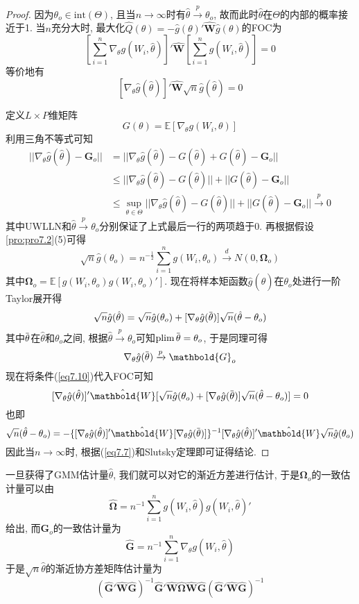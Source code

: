 \documentclass[cn, 12pt, math=mtpro2, bibstyle=apa, blue, twocol]{elegantbook}
\newcommand{\E}{\mathbb{E}}
\newcommand{\W}{\mathbold{W}}
\newcommand{\BO}{\mathbold{\Omega}}
\newcommand{\overbar}[1]{\mkern 1.5mu\overline{\mkern-1.5mu#1\mkern-1.5mu}\mkern 1.5mu}
\begin{document}
\begin{proof}
  因为$\theta_o\in\text{int}(\Theta)$, 且当$n\to\infty$时有$\hat{\theta}\xrightarrow{p}\theta_o$, 故而此时$\hat{\theta}$在$\Theta$的内部的概率接近于1. 当$n$充分大时, 最大化$\hat{Q}(\theta)=-\hat{g}(\theta)'\hat{\W}\hat{g}(\theta)$的FOC为
  $$\left[\sum_{i=1}^{n}\nabla_\theta g(W_i,\hat{\theta})\right]'\hat{\W}\left[\sum_{i=1}^{n} g(W_i,\hat{\theta})\right]=0$$
  等价地有
  $$[\nabla_\theta \hat{g}(\hat{\theta})]'\hat{\W}\sqrt{n}\hat{g}(\hat{\theta})=0$$

  定义$L\times P$维矩阵
  $$G(\theta)=\E[\nabla_\theta g(W_i,\theta)]$$
  利用三角不等式可知
  \begin{align*}
  ||\nabla_\theta \hat{g}(\hat{\theta})-\mathbold{G}_o||&=||\nabla_\theta\hat{g}(\hat{\theta})-G(\hat{\theta})+G(\hat{\theta})-\mathbold{G}_o|| \\
  &\leq ||\nabla_\theta \hat{g}(\hat{\theta})-G(\hat{\theta})||+||G(\hat{\theta})-\mathbold{G}_o|| \\
  &\leq \sup_{\theta\in\Theta}||\nabla_\theta \hat{g}(\hat{\theta})-G(\hat{\theta})||+||G(\hat{\theta})-\mathbold{G}_o|| \xrightarrow{p}0
  \end{align*}
  其中UWLLN和$\hat{\theta}\xrightarrow{p}\theta_o$分别保证了上式最后一行的两项趋于0. 再根据假设\ref{pro:pro7.2}(5)可得
  \begin{equation}\label{eq7.7}
    \sqrt{n}\hat{g}(\theta_o)=n^{-\frac{1}{2}}\sum_{i=1}^{n}g(W_i,\theta_o)\xrightarrow{d} N(0,\BO_o)
  \end{equation}
  其中$\BO_o=\E[g(W_i,\theta_o)g(W_i,\theta_o)']$. 现在将样本矩函数$\hat{g}(\hat{\theta})$在$\theta_o$处进行一阶Taylor展开得
  \begin{equation}\label{eq7.10}
    \sqrt{n}\hat{g}(\hat{\theta})=\sqrt{n}\hat{g}(\theta_o)+[\nabla_\theta\hat{g}(\overbar{\theta})]\sqrt{n}(\hat{\theta}-\theta_o)
  \end{equation}
  其中$\overbar{\theta}$在$\hat{\theta}$和$\theta_o$之间, 根据$\hat{\theta}\xrightarrow{p}\theta_o$可知$\text{plim}\,\overbar{\theta}=\theta_o$, 于是同理可得
  $$\nabla_\theta \hat{g}(\overbar{\theta})\xrightarrow{p} \mathbold{G}_o$$
  现在将条件(\ref{eq7.10})代入FOC可知
  $$[\nabla_\theta \hat{g}(\hat{\theta})]'\hat{\W}[\sqrt{n}\hat{g}(\theta_o)+[\nabla_\theta\hat{g}(\overbar{\theta})]\sqrt{n}(\hat{\theta}-\theta_o)]=0$$
  也即
  $$\sqrt{n}(\hat{\theta}-\theta_o)=-\{[\nabla_\theta \hat{g}(\hat{\theta})]'\hat{\W}[\nabla_\theta\hat{g}(\overbar{\theta})]\}^{-1}[\nabla_\theta \hat{g}(\hat{\theta})]'\hat{\W}\sqrt{n}\hat{g}(\theta_o)$$
  因此当$n\to\infty$时, 根据(\ref{eq7.7})和Slutsky定理即可证得结论.
\end{proof}
一旦获得了GMM估计量$\hat{\theta}$, 我们就可以对它的渐近方差进行估计, 于是$\mathbold{\Omega}_o$的一致估计量可以由
$$\hat{\mathbold{\Omega}}=n^{-1}\sum_{i=1}^{n}g(W_i,\hat{\theta})g(W_i,\hat{\theta})'$$
给出, 而$\mathbold{G}_o$的一致估计量为
$$\hat{\mathbold{G}}=n^{-1}\sum_{i=1}^{n}\nabla_\theta g(W_i,\hat{\theta})$$
于是$\sqrt{n}\hat{\theta}$的渐近协方差矩阵估计量为
$$(\hat{\mathbold{G}}'\hat{\W}\hat{\mathbold{G}})^{-1}\hat{\mathbold{G}}'\hat{\W}\hat{\BO}\hat{\W}\hat{\mathbold{G}}(\hat{\mathbold{G}}'\hat{\W}\hat{\mathbold{G}})^{-1}$$
\end{document}
